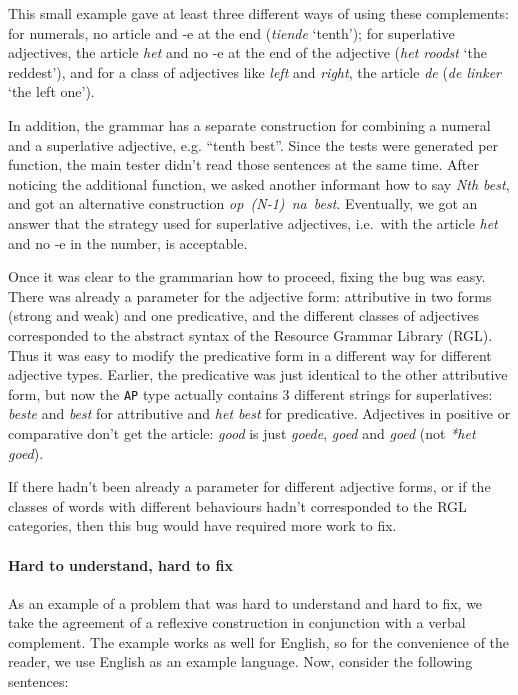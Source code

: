 This small example gave at least three different ways of using these
complements: for numerals, no article and -e at the end (\emph{tiende}
`tenth'); for superlative adjectives, the article \emph{het} and no -e
at the end of the adjective (\emph{het roodst} `the reddest'), and for
a class of adjectives like \emph{left} and \emph{right}, the article
\emph{de} (\emph{de linker} `the left one').

In addition, the grammar has a separate construction for combining a
numeral and a superlative adjective, e.g. ``tenth best''. Since the
tests were generated per function, the main tester didn't read those
sentences at the same time. After noticing the additional function, we
asked another informant how to say \emph{Nth best}, and got an
alternative construction \mbox{\emph{op~(N-1)~na~best}}. Eventually, we got an
answer that the strategy used for superlative adjectives, i.e.~with the
article \emph{het} and no -e in the number, is acceptable.

Once it was clear to the grammarian how to proceed, fixing the bug was
easy. There was already a parameter for the adjective form: attributive
in two forms (strong and weak) and one predicative, and the different
classes of adjectives corresponded to the abstract syntax of the \gf{}
Resource Grammar Library (RGL).
Thus it was easy to modify the predicative form in a different way for
different adjective types. Earlier, the predicative was just identical
to the other attributive form, but now the \texttt{AP} type actually
contains 3 different strings for superlatives: \emph{beste} and
\emph{best} for attributive and \emph{het best} for predicative.
Adjectives in positive or comparative don't get the article: \emph{good}
is just \emph{goede}, \emph{goed} and \emph{goed} (not \emph{*het
goed}).

If there hadn't been already a parameter for different adjective forms,
or if the classes of words with different behaviours hadn't corresponded
to the RGL categories, then this bug would have required more work to fix.

\paragraph{Hard to understand, hard to
fix}\label{hard-to-understand-hard-to-fix}

As an example of a problem that was hard to understand and hard to
fix, we take the agreement of a reflexive construction in conjunction
with a verbal complement. The example works as well for English, so
for the convenience of the reader, we use English as an example
language.  Now, consider the following sentences:

